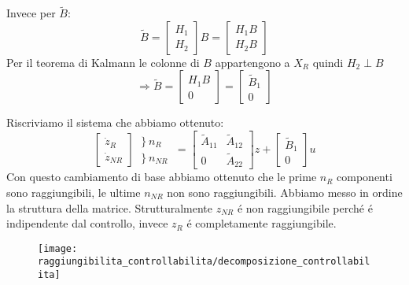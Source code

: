\documentclass[../main.tex]{subfiles}
\begin{document}
		Invece per $ \tilde B $:
		\[
			\tilde B=
			\begin{bmatrix}
				H_1\\
				H_2
			\end{bmatrix} B =
			\begin{bmatrix}
				H_1 B\\
				H_2 B
			\end{bmatrix}
		\]
		Per il teorema di Kalmann le colonne di $ B $ appartengono a $ X_R $ quindi $ H_2 \perp B $
		\[
			\Rightarrow \tilde B =
			\begin{bmatrix}
				H_1 B\\
				0
			\end{bmatrix} =
			\begin{bmatrix}
					\tilde B_1\\
					0
			\end{bmatrix}
		\]
		
		Riscriviamo il sistema che abbiamo ottenuto:
		\[
			\begin{bmatrix}
				\dot z_R\\
				\dot z_{NR}
			\end{bmatrix}
			\begin{matrix}
				\left. \right\rbrace n_R \phantom{R}\\
				\left. \right\rbrace n_{NR}
			\end{matrix} =
			\begin{bmatrix}
				\tilde A_{11} & \tilde A_{12}\\
				0 & \tilde A_{22}
			\end{bmatrix} z +
			\begin{bmatrix}
				\tilde B_1\\
				0
			\end{bmatrix} u
		\]
		Con questo cambiamento di base abbiamo ottenuto che le prime $ n_R $ componenti sono raggiungibili, le ultime $ n_{NR} $ non sono raggiungibili. Abbiamo messo in ordine la struttura della matrice. Strutturalmente $ z_{NR} $ \'e non raggiungibile perch\'e \'e indipendente dal controllo, invece $ z_R $ \'e completamente raggiungibile.
		\begin{figure}[h!]
			\centering\texttt{[image: raggiungibilita\_controllabilita/decomposizione\_controllabilita]}
		\end{figure}
		
\end{document}
